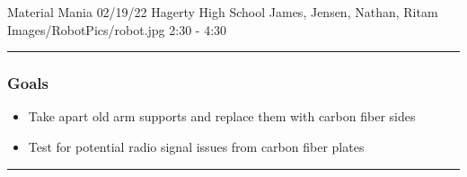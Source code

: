\insertmeeting 
	{Material Mania} 
	{02/19/22} 
	{Hagerty High School}
	{James, Jensen, Nathan, Ritam}
	{Images/RobotPics/robot.jpg}
	{2:30 - 4:30}
	
\noindent\hfil\rule{\textwidth}{.4pt}\hfil
\subsubsection*{Goals}
\begin{itemize}
    \item Take apart old arm supports and replace them with carbon fiber sides
	\item Test for potential radio signal issues from carbon fiber plates


\end{itemize} 

\noindent\hfil\rule{\textwidth}{.4pt}\hfil

